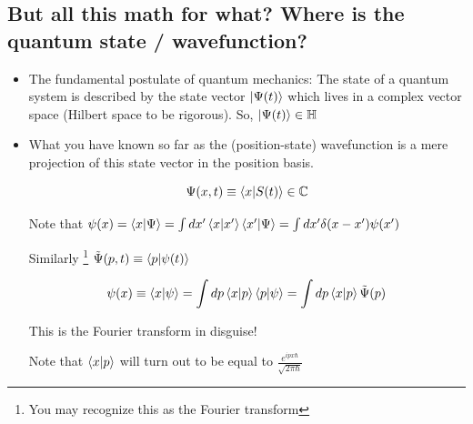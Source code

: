 \documentclass{article}
\begin{document}
\subsection*{But all this math for what? Where is the quantum state / wavefunction?}

\begin{itemize}
    \item The fundamental postulate of quantum mechanics: The state of a quantum system is described by the state vector $\ket{\Psi(t)}$ which lives in a complex vector space (Hilbert space to be rigorous). So, $\ket{\Psi(t)} \in \mathbb{H}$
    
    \item What you have known so far as the (position-state) wavefunction is a mere projection of this state vector in the position basis. 
    
    $$\Psi(x,t) \equiv \braket{x|S(t)} \in \mathbb{C}$$
    
    Note that $\psi(x) = \braket{x|\Psi} = \int dx' \braket{x|x'} \braket{x'|\Psi} = \int dx' \delta(x-x') \psi(x')$
    
    Similarly \footnote{You may recognize this as the Fourier transform} $\Tilde{\Psi} (p,t) \equiv \braket{p|\psi(t)}$
    
    $$\psi(x) \equiv \braket{x|\psi} = \int dp \braket{x|p} \braket{p|\psi} = \int dp \braket{x|p} \Tilde{\Psi} (p)$$
    
    This is the Fourier transform in disguise!
    
    Note that $\braket{x|p}$ will turn out to be equal to $\frac{e^{ipx\hbar}}{\sqrt{2 \pi \hbar}}$
\end{itemize}
\end{document}
